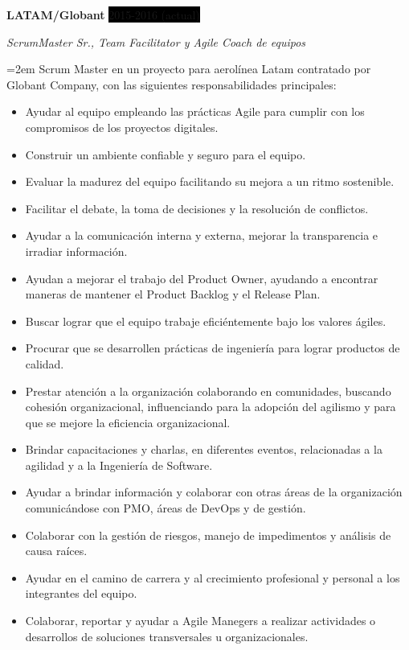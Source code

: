 \documentclass[paper=a4,fontsize=11pt]{scrartcl} %
\newcommand{\sepspace}{\vspace*{1em}}		%
\newcommand{\EducationEntry}[4]{
		\noindent \textbf{#1} \hfill      %
		\colorbox{Black}{%
			\parbox{6em}{%
			\hfill\color{White}#2}} \par  %
		\noindent \textit{#3} \par        %
		\noindent\hangindent=2em\hangafter=0 \small #4 %
		\normalsize \par}
\newcommand{\WorkEntry}[4]{				  %
		\noindent \textbf{#1} \hfill      %
		\colorbox{Black}{\color{White}#2} \par  %
		\noindent \textit{#3} \par              %
		\noindent\hangindent=2em\hangafter=0 \small #4 %
		\normalsize \par}
\begin{document}
\WorkEntry{LATAM/Globant}{2015-2016 (actual)}{ScrumMaster Sr., Team Facilitator y Agile Coach de equipos}
{Scrum Master en un proyecto para aerolínea Latam contratado por Globant Company, con las siguientes responsabilidades principales:
\begin{itemize}
\item Ayudar al equipo empleando las prácticas Agile para cumplir con los compromisos de los proyectos digitales.
\item Construir un ambiente confiable y seguro para el equipo.
\item Evaluar la madurez del equipo facilitando su mejora a un ritmo sostenible.
\item Facilitar el debate, la toma de decisiones y la resolución de conflictos.
\item Ayudar a la comunicación interna y externa, mejorar la transparencia e irradiar información.
\item Ayudan a mejorar el trabajo del Product Owner, ayudando a encontrar maneras de mantener el Product Backlog y el Release Plan.
\item Buscar lograr que el equipo trabaje eficiéntemente bajo los valores ágiles.
\item Procurar que se desarrollen prácticas de ingeniería para lograr productos de calidad.
\item Prestar atención a la organización colaborando en comunidades, buscando cohesión organizacional, influenciando para la adopción del agilismo y para que se mejore la eficiencia organizacional.
\item Brindar capacitaciones y charlas, en diferentes eventos, relacionadas a la agilidad y a la Ingeniería de Software.
\item Ayudar a brindar información y colaborar con otras áreas de la organización comunicándose con PMO, áreas de DevOps y de gestión.
\item Colaborar con la gestión de riesgos, manejo de impedimentos y análisis de causa raíces.
\item Ayudar en el camino de carrera y al crecimiento profesional y personal a los integrantes del equipo.
\item Colaborar, reportar y ayudar a Agile Manegers a realizar actividades o desarrollos de soluciones transversales u organizacionales.
\end{itemize}
}

\sepspace
\end{document}
